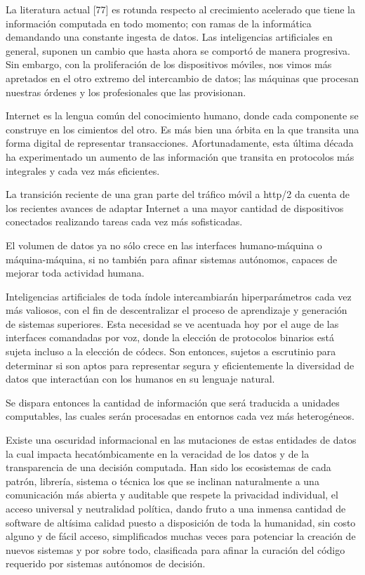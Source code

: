 
La literatura actual [77] es rotunda respecto al crecimiento acelerado que tiene la información computada en todo momento; con ramas de la informática demandando una constante ingesta de datos. Las inteligencias artificiales en general, suponen un cambio que hasta ahora se comportó de manera progresiva. Sin embargo, con la proliferación de los dispositivos móviles, nos vimos más apretados en el otro extremo del intercambio de datos; las máquinas que procesan nuestras órdenes y los profesionales que las provisionan.

Internet es la lengua común del conocimiento humano, donde cada componente se construye en los cimientos del otro. Es más bien una órbita en la que transita una forma digital de representar transacciones. Afortunadamente, esta última década ha experimentado un aumento de las información que transita en protocolos más integrales y cada vez más eficientes.

La transición reciente de una gran parte del tráfico móvil a http/2 da cuenta de los recientes avances de adaptar Internet a una mayor cantidad de dispositivos conectados realizando tareas cada vez más sofisticadas.

El volumen de datos ya no sólo crece en las interfaces humano-máquina o máquina-máquina, si no también para afinar sistemas autónomos, capaces de mejorar toda actividad humana.

Inteligencias artificiales de toda índole intercambiarán hiperparámetros cada vez más valiosos, con el fin de descentralizar el proceso de aprendizaje y generación de sistemas superiores. Esta necesidad se ve acentuada hoy por el auge de las interfaces comandadas por voz, donde la elección de protocolos binarios está sujeta incluso a la elección de códecs. Son entonces, sujetos a escrutinio para determinar si son aptos para representar segura y eficientemente la diversidad de datos que interactúan con los humanos en su lenguaje natural.


Se dispara entonces la cantidad de información que será traducida a unidades computables, las cuales serán procesadas en entornos cada vez más heterogéneos.


Existe una oscuridad informacional en las mutaciones de estas entidades de datos la cual impacta hecatómbicamente en la veracidad de los datos y de la transparencia de una decisión computada. Han sido los ecosistemas de cada patrón, librería, sistema o técnica los que se inclinan naturalmente a una comunicación más abierta y auditable que respete la privacidad individual, el acceso universal y neutralidad política, dando fruto a una inmensa cantidad de software de altísima calidad puesto a disposición de toda la humanidad, sin costo alguno y de fácil acceso, simplificados muchas veces para potenciar la creación de nuevos sistemas y por sobre todo, clasificada para afinar la curación del código requerido por sistemas autónomos de decisión.

